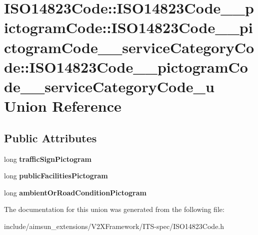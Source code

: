 \hypertarget{unionISO14823Code_1_1ISO14823Code____pictogramCode_1_1ISO14823Code____pictogramCode____serviceCae55999a37109a17de215317f84c86695}{}\section{I\+S\+O14823\+Code\+:\+:I\+S\+O14823\+Code\+\_\+\+\_\+pictogram\+Code\+:\+:I\+S\+O14823\+Code\+\_\+\+\_\+pictogram\+Code\+\_\+\+\_\+service\+Category\+Code\+:\+:I\+S\+O14823\+Code\+\_\+\+\_\+pictogram\+Code\+\_\+\+\_\+service\+Category\+Code\+\_\+u Union Reference}
\label{unionISO14823Code_1_1ISO14823Code____pictogramCode_1_1ISO14823Code____pictogramCode____serviceCae55999a37109a17de215317f84c86695}
\subsection*{Public Attributes}
\begin{DoxyCompactItemize}
\item 
long {\bfseries traffic\+Sign\+Pictogram}\hypertarget{unionISO14823Code_1_1ISO14823Code____pictogramCode_1_1ISO14823Code____pictogramCode____serviceCae55999a37109a17de215317f84c86695_a41bdf0e8fe72a181b8bdef6eca1fea08}{}\label{unionISO14823Code_1_1ISO14823Code____pictogramCode_1_1ISO14823Code____pictogramCode____serviceCae55999a37109a17de215317f84c86695_a41bdf0e8fe72a181b8bdef6eca1fea08}

\item 
long {\bfseries public\+Facilities\+Pictogram}\hypertarget{unionISO14823Code_1_1ISO14823Code____pictogramCode_1_1ISO14823Code____pictogramCode____serviceCae55999a37109a17de215317f84c86695_a396da5ef7bc09d823c9589caeb545fd4}{}\label{unionISO14823Code_1_1ISO14823Code____pictogramCode_1_1ISO14823Code____pictogramCode____serviceCae55999a37109a17de215317f84c86695_a396da5ef7bc09d823c9589caeb545fd4}

\item 
long {\bfseries ambient\+Or\+Road\+Condition\+Pictogram}\hypertarget{unionISO14823Code_1_1ISO14823Code____pictogramCode_1_1ISO14823Code____pictogramCode____serviceCae55999a37109a17de215317f84c86695_aa751164d7eaad2f03050ab731807854a}{}\label{unionISO14823Code_1_1ISO14823Code____pictogramCode_1_1ISO14823Code____pictogramCode____serviceCae55999a37109a17de215317f84c86695_aa751164d7eaad2f03050ab731807854a}

\end{DoxyCompactItemize}


The documentation for this union was generated from the following file\+:\begin{DoxyCompactItemize}
\item 
include/aimsun\+\_\+extensions/\+V2\+X\+Framework/\+I\+T\+S-\/spec/I\+S\+O14823\+Code.\+h\end{DoxyCompactItemize}

